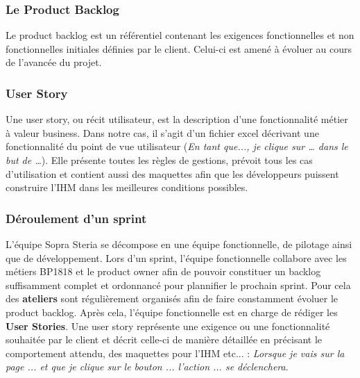 	\subsubsection{Le Product Backlog}
	Le product backlog est un référentiel contenant les exigences fonctionnelles et non fonctionnelles initiales définies par le client. Celui-ci est amené à évoluer au cours de l'avancée du projet.
	
	\subsubsection{User Story}
	Une user story, ou récit utilisateur, est la description d'une fonctionnalité métier à valeur business. Dans notre cas, il s'agit d'un fichier excel décrivant une fonctionnalité du point de vue utilisateur (\textit{En tant que..., je clique sur … dans le but de …}). Elle présente toutes les règles de gestions, prévoit tous les cas d'utilisation et contient aussi des maquettes afin que les développeurs puissent construire l'IHM dans les meilleures conditions possibles.
	
	\subsubsection{Déroulement d'un sprint}
	L'équipe Sopra Steria se décompose en une équipe fonctionnelle, de pilotage ainsi que de développement. Lors d'un sprint, l'équipe fonctionnelle collabore avec les métiers BP1818 et le product owner afin de pouvoir constituer un backlog suffisamment complet et ordonnancé pour plannifier le prochain sprint. Pour cela des \textbf{ateliers} sont régulièrement organisés afin de faire constamment évoluer le product backlog. Après cela, l'équipe fonctionnelle est en charge de rédiger les \textbf{User Stories}. Une user story représente une exigence ou une fonctionnalité souhaitée par le client et décrit celle-ci de manière détaillée en précisant le comportement attendu, des maquettes pour l'IHM etc... : \textit{Lorsque je vais sur la page ... et que je clique sur le bouton ... l'action ... se déclenchera}. \\
	
